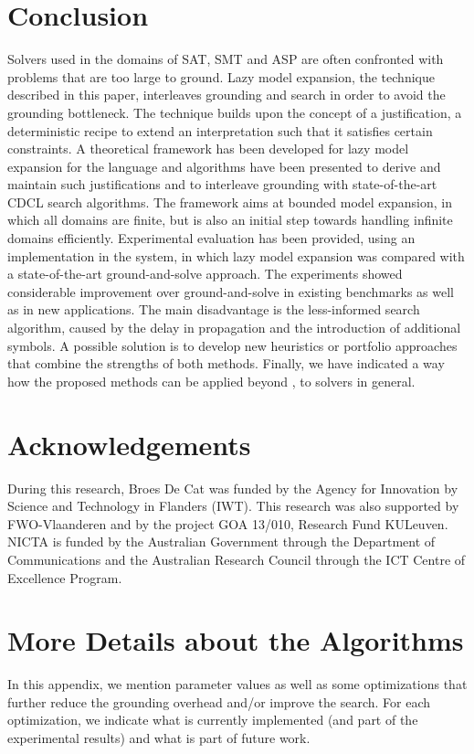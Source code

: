 \documentclass[11pt]{article}
\newcommand{\logicname}[1]{\text{\sc #1}\xspace}
\newcommand{\idp}{\logicname{IDP}}
\newcommand{\foid}{\logicname{FO(\ensuremath{ID})}}
\theoremstyle{plain}
\theoremstyle{definition}
\theoremstyle{example_basic}
\theoremstyle{example_contd}
\theoremstyle{plain}
\newcommand{\change}[1]{#1}
\begin{document}
\section{Conclusion}
Solvers used in the domains of SAT, SMT and ASP are often confronted with problems that are too large to ground. Lazy model expansion, the technique described in this paper, interleaves grounding and search in order to avoid the grounding bottleneck. The technique builds upon the concept of a  justification, a deterministic recipe to extend an interpretation such that it satisfies certain constraints. 
A theoretical framework has been developed for lazy model expansion for the language \foid and algorithms have been presented to derive and maintain such justifications and to interleave grounding with state-of-the-art CDCL search algorithms. The framework aims at bounded model expansion, in which all domains are finite, but is also an initial step towards handling infinite domains efficiently. Experimental evaluation has been provided, using an implementation in
the \idp system, in which lazy model expansion was compared with a state-of-the-art ground-and-solve approach. The experiments showed considerable improvement over ground-and-solve in existing benchmarks as well as in new applications.
The main disadvantage is the less-informed search algorithm, caused by the delay in propagation and the introduction of additional symbols. \change{A possible solution is to develop new heuristics or  portfolio approaches that combine the strengths of both methods.} Finally, we have indicated a way how the proposed methods can be applied beyond \foid, to \ASP solvers in general.  

\section*{Acknowledgements}
During this research, Broes De Cat was funded by the Agency for
Innovation by Science and Technology in Flanders (IWT). This research
was also supported by FWO-Vlaanderen and by the project GOA 13/010,
Research Fund KULeuven. NICTA is funded by the Australian Government through
the Department of Communications and the Australian Research Council through
the ICT Centre of Excellence Program.


\appendix

\section{More Details about the Algorithms}\label{app:furtherconsid}
In this appendix, we mention parameter values as well as some
optimizations that further reduce the grounding overhead and/or
improve the search. \change{For each optimization, we indicate what is currently implemented (and part of the experimental results) and what is part of future work.}
\end{document}
